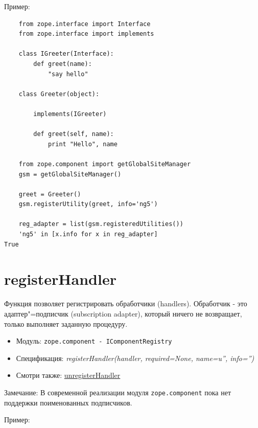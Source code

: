 \documentclass[a4paper,openany,twoside,draft]{book}
\providecommand*{\DUroletitlereference}[1]{\textsl{#1}}
\begin{document}
Пример:

\begin{verbatim}
    from zope.interface import Interface
    from zope.interface import implements

    class IGreeter(Interface):
        def greet(name):
            "say hello"

    class Greeter(object):

        implements(IGreeter)

        def greet(self, name):
            print "Hello", name

    from zope.component import getGlobalSiteManager
    gsm = getGlobalSiteManager()

    greet = Greeter()
    gsm.registerUtility(greet, info='ng5')

    reg_adapter = list(gsm.registeredUtilities())
    'ng5' in [x.info for x in reg_adapter]
True
\end{verbatim}


\section*{registerHandler%
  \label{registerhandler}%
}

Функция позволяет регистрировать обработчики (handlers). Обработчик - это адаптер"=подписчик (subscription adapter), который ничего не возвращает, только выполняет заданную процедуру.

\begin{itemize}

\item Модуль: \texttt{zope.component - IComponentRegistry}

\item Спецификация: \DUroletitlereference{registerHandler(handler, required=None, name=u'', info='')}

\item Смотри также: \hyperref[unregisterhandler]{unregisterHandler}

\end{itemize}

Замечание: В современной реализации модуля \texttt{zope.component} пока нет поддержки поименованных подписчиков.

Пример:
\end{document}
